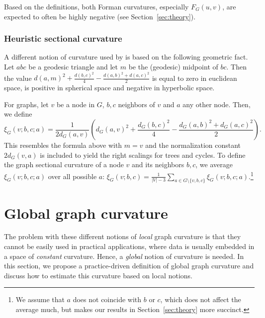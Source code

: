 \documentclass[runningheads]{llncs}
\begin{document}
Based on the definitions, both Forman curvatures, especially $F_G(u,v)$, are expected to often be highly negative (see Section~\ref{sec:theory}).

\subsubsection{Heuristic sectional curvature}

A different notion of curvature used by \cite{gu2019learning} is based on the following geometric fact. 
Let $abc$ be a geodesic triangle and let $m$ be the (geodesic) midpoint of $bc$. Then the value
$	d(a,m)^2 + \frac{d(b,c)^2}{4} - \frac{d(a,b)^2 + d(a,c)^2}{2}$
is equal to zero in euclidean space, is positive in spherical space and negative in hyperbolic space.

For graphs, let $v$ be a node in $G$, $b,c$ neighbors of $v$ and $a$ any other node. Then, we define
\begin{equation}
\xi_G(v;b,c;a) = \frac{1}{2 d_G(a,v)} \left( d_G(a,v)^2 + \frac{d_G(b,c)^2}{4} - \frac{d_G(a,b)^2 + d_G(a,c)^2}{2} \right).
\end{equation}
This resembles
the formula above
with $m = v$ and the normalization constant $2d_G(v,a)$ is included to yield the right scalings for trees and cycles.
To define the graph sectional curvature of a node $v$ and its neighbors $b,c$, we average $\xi_G(v;b,c;a)$ over all possible $a$: 
$\xi_G(v; b,c) = \frac{1}{|V|-3} \sum_{a \in G\setminus \{v,b,c\}} \xi_G(v;b,c;a)$.\footnote{We assume that $a$ does not coincide with $b$ or $c$, which does not affect the average much, but makes our results in Section~\ref{sec:theory} more succinct.}

\section{Global graph curvature}\label{sec:global}

The problem with these different notions of \textit{local} graph curvature is that they cannot be easily used in practical applications, where data is usually embedded in a space of \textit{constant} curvature.
Hence, a \textit{global} notion of curvature is needed. 
In this section, we propose a practice-driven definition of global graph curvature and discuss how to estimate this curvature based on local notions. 
\end{document}

